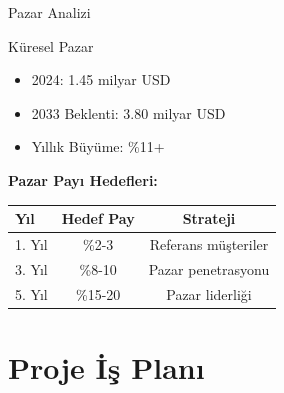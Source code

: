 \documentclass[aspectratio=169,xcolor={dvipsnames}]{beamer}
\begin{document}
\begin{frame}{Pazar Analizi}
\begin{block}{Küresel Pazar}
\begin{itemize}
\item 2024: 1.45 milyar USD
\item 2033 Beklenti: 3.80 milyar USD
\item Yıllık Büyüme: \%11+
\end{itemize}
\end{block}

\textbf{Pazar Payı Hedefleri:}
\begin{table}
\centering
\begin{tabular}{lcc}
\toprule
\textbf{Yıl} & \textbf{Hedef Pay} & \textbf{Strateji} \\
\midrule
1. Yıl & \%2-3 & Referans müşteriler \\
3. Yıl & \%8-10 & Pazar penetrasyonu \\
5. Yıl & \%15-20 & Pazar liderliği \\
\bottomrule
\end{tabular}
\end{table}
\end{frame}

\section{Proje İş Planı}
\end{document}
